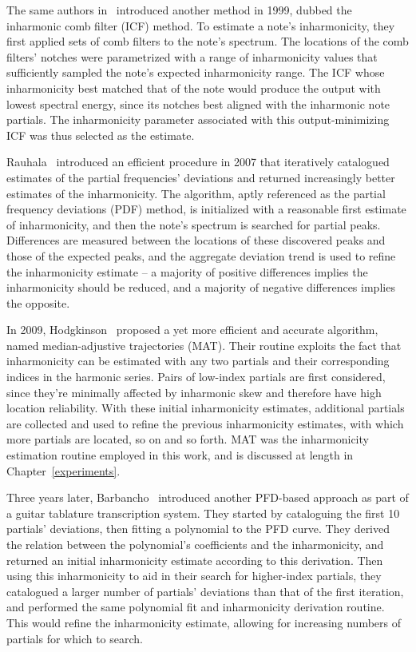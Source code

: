 \documentclass[12pt]{cmuthesis}
\begin{document}
 The same authors in~\cite{galembo1999} introduced another method in 1999, dubbed the inharmonic comb filter (ICF) method. To estimate a note's inharmonicity, they first applied sets of comb filters to the note's spectrum. The locations of the comb filters' notches were parametrized with a range of inharmonicity values that sufficiently sampled the note's expected inharmonicity range. The ICF whose inharmonicity best matched that of the note would produce the output with lowest spectral energy, since its notches best aligned with the inharmonic note partials. The inharmonicity parameter associated with this output-minimizing ICF was thus selected as the estimate.
 
Rauhala~\cite{rauhala2007} introduced an efficient procedure in 2007 that iteratively catalogued estimates of the partial frequencies' deviations and returned increasingly better estimates of the inharmonicity. The algorithm, aptly referenced as the partial frequency deviations (PDF) method, is initialized with a reasonable first estimate of inharmonicity, and then the note's spectrum is searched for partial peaks. Differences are measured between the locations of these discovered peaks and those of the expected peaks, and the aggregate deviation trend is used to refine the inharmonicity estimate -- a majority of positive differences implies the inharmonicity should be reduced, and a majority of negative differences implies the opposite.

In 2009, Hodgkinson~\cite{hodgkinson2009} proposed a yet more efficient and accurate algorithm, named median-adjustive trajectories (MAT). Their routine exploits the fact that inharmonicity can be estimated with any two partials and their corresponding indices in the harmonic series. Pairs of low-index partials are first considered, since they're minimally affected by inharmonic skew and therefore have high location reliability. With these initial inharmonicity estimates, additional partials are collected and used to refine the previous inharmonicity estimates, with which more partials are located, so on and so forth. MAT was the inharmonicity estimation routine employed in this work, and is discussed at length in Chapter~\ref{experiments}.

Three years later, Barbancho~\cite{barbanchoi2012} introduced another PFD-based approach as part of a guitar tablature transcription system. They started by cataloguing the first 10 partials' deviations, then fitting a polynomial to the PFD curve. They derived the relation between the polynomial's coefficients and the inharmonicity, and returned an initial inharmonicity estimate according to this derivation. Then using this inharmonicity to aid in their search for higher-index partials, they catalogued a larger number of partials' deviations than that of the first iteration, and performed the same polynomial fit and inharmonicity derivation routine. This would refine the inharmonicity estimate, allowing for increasing numbers of partials for which to search.
\end{document}
